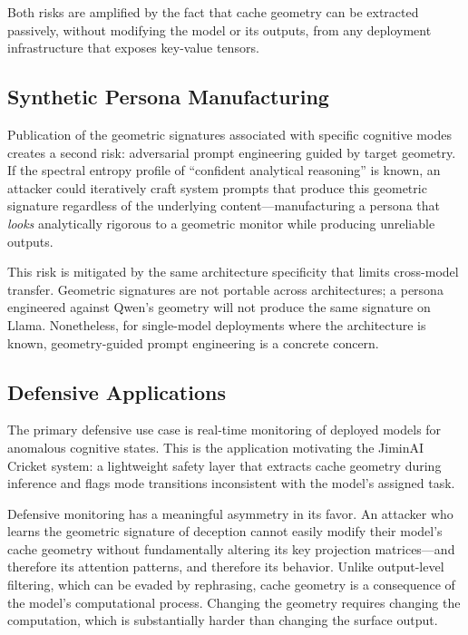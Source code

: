 Both risks are amplified by the fact that cache geometry can be extracted passively, without modifying the model or its outputs, from any deployment infrastructure that exposes key-value tensors.

\subsection{Synthetic Persona Manufacturing}

Publication of the geometric signatures associated with specific cognitive modes creates a second risk: adversarial prompt engineering guided by target geometry.
If the spectral entropy profile of ``confident analytical reasoning'' is known, an attacker could iteratively craft system prompts that produce this geometric signature regardless of the underlying content---manufacturing a persona that \emph{looks} analytically rigorous to a geometric monitor while producing unreliable outputs.

This risk is mitigated by the same architecture specificity that limits cross-model transfer.
Geometric signatures are not portable across architectures; a persona engineered against Qwen's geometry will not produce the same signature on Llama.
Nonetheless, for single-model deployments where the architecture is known, geometry-guided prompt engineering is a concrete concern.

\subsection{Defensive Applications}

The primary defensive use case is real-time monitoring of deployed models for anomalous cognitive states.
This is the application motivating the JiminAI Cricket system: a lightweight safety layer that extracts cache geometry during inference and flags mode transitions inconsistent with the model's assigned task.

Defensive monitoring has a meaningful asymmetry in its favor.
An attacker who learns the geometric signature of deception cannot easily modify their model's cache geometry without fundamentally altering its key projection matrices---and therefore its attention patterns, and therefore its behavior.
Unlike output-level filtering, which can be evaded by rephrasing, cache geometry is a consequence of the model's computational process.
Changing the geometry requires changing the computation, which is substantially harder than changing the surface output.

